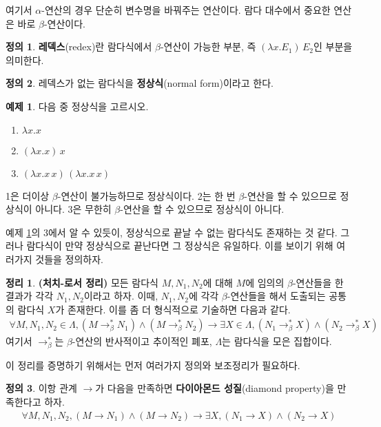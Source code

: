 \documentclass[b5paper]{book}
\theoremstyle{definition}
\newtheorem{defn}{정의}[chapter]
\newtheorem{thm}{정리}[chapter]
\newtheorem{ex}{예제}[chapter]
\begin{document}
여기서 $\alpha$-연산의 경우 단순히 변수명을 바꿔주는 연산이다. 람다 대수에서 
중요한 연산은 바로 $\beta$-연산이다. 
\begin{defn}
    \textbf{레덱스}(redex)란 람다식에서 $\beta$-연산이 가능한 부분, 즉 
    $( \lambda x. E_1 ) \, E_2$인 부분을 의미한다.
\end{defn}
\begin{defn}
    레덱스가 없는 람다식을 \textbf{정상식}(normal form)이라고 한다.
\end{defn}
\begin{ex}
    \label{normal form ex}
    다음 중 정상식을 고르시오.
    \begin{enumerate}
        \item $\lambda x. x$
        \item $(\lambda x. x) \, x$
        \item $(\lambda x.x \, x) \, (\lambda x. x \, x)$
    \end{enumerate}
    1은 더이상 $\beta$-연산이 불가능하므로 정상식이다. 2는 한 번 $\beta$-연산을 할 수 
    있으므로 정상식이 아니다. 3은 무한히 $\beta$-연산을 할 수 있으므로
    정상식이 아니다.
\end{ex}
예제 \ref{normal form ex}의 3에서 알 수 있듯이, 정상식으로 끝날 수 없는 람다식도
존재하는 것 같다. 그러나 람다식이 만약 정상식으로 끝난다면 그 정상식은 유일하다. 이를
보이기 위해 여러가지 것들을 정의하자.
\begin{thm} \label{church-rosser}
    \textbf{(처치-로서 정리)} 모든 람다식 $M, N_1, N_2$에 대해 $M$에 
    임의의 $\beta$-연산들을 한 결과가 각각 $N_1, N_2$이라고 하자. 이때,
    $N_1, N_2$에 각각 $\beta$-연산들을 해서 도출되는 공통의 람다식 $X$가 존재한다.
    이를 좀 더 형식적으로 기술하면 다음과 같다.
    \begin{align*}
        \forall M, N_1, N_2 \in \Lambda, (M \rightarrow_\beta^* N_1) \wedge 
        (M \rightarrow_\beta^* N_2) \rightarrow \exists X \in \Lambda,
        (N_1 \rightarrow_\beta^* X) \wedge (N_2 \rightarrow_\beta^* X)
    \end{align*}
    여기서 $\rightarrow_\beta^*$는 $\beta$-연산의 
    반사적이고 추이적인 폐포, $\Lambda$는 람다식을 모은 집합이다.
\end{thm}
이 정리를 증명하기 위해서는 먼저 여러가지 정의와 보조정리가 필요하다.
\begin{defn}
    이항 관계 $\rightarrow$가 다음을 만족하면 \textbf{다이아몬드 성질}(diamond
    property)을 만족한다고 하자.
    \begin{align*}
        \forall M, N_1, N_2, (M \rightarrow N_1) \wedge (M \rightarrow N_2) 
        \rightarrow \exists X, (N_1 \rightarrow X) \wedge (N_2 \rightarrow X)
    \end{align*}
\end{defn}
\end{document}
